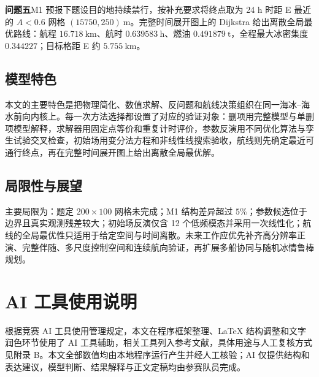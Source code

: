 \documentclass[UTF8,fontset=none]{ctexart}
\begin{document}
\par \textbf{问题五}M1 预报下题设目的地持续禁行，按补充要求将终点取为 24 h 时距 E 最近的 $A<0.6$ 网格 $(15750,250)\ \mathrm m$。完整时间展开图上的 Dijkstra 给出离散全局最优路线：航程 $16.718\ \mathrm{km}$、航时 $0.639583\ \mathrm h$、燃油 $0.491879\ \mathrm t$，全程最大冰密集度 $0.344227$；目标格距 E 约 $5.755\ \mathrm{km}$。

\subsection{模型特色}

本文的主要特色是把物理简化、数值求解、反问题和航线决策组织在同一海冰--海水前向内核上。每一次方法选择都设置了对应的验证对象：删项用完整模型与单删项模型解释，求解器用固定点等价和重复计时评价，参数反演用不同优化算法与孪生试验交叉检查，初始场用变分法方程和非线性线搜索验收，航线则先确定最近可通行终点，再在完整时间展开图上给出离散全局最优解。

\subsection{局限性与展望}

主要局限为：题定 $200\times100$ 网格未完成；M1 结构差异超过 $5\%$；参数候选位于边界且真实观测残差较大；初始场反演仅含 12 个低频模态并采用一次线性化；航线的全局最优性只适用于给定空间与时间离散。未来工作应优先补齐高分辨率正演、完整伴随、多尺度控制空间和连续航向验证，再扩展多船协同与随机冰情鲁棒规划。

\section*{AI 工具使用说明}

根据竞赛 AI 工具使用管理规定，本文在程序框架整理、LaTeX 结构调整和文字润色环节使用了 AI 工具辅助，相关工具列入参考文献\cite{openai_codex}，具体用途与人工复核方式见附录 B。本文全部数值均由本地程序运行产生并经人工核验；AI 仅提供结构和表达建议，模型判断、结果解释与正文定稿均由参赛队员完成。
\end{document}
